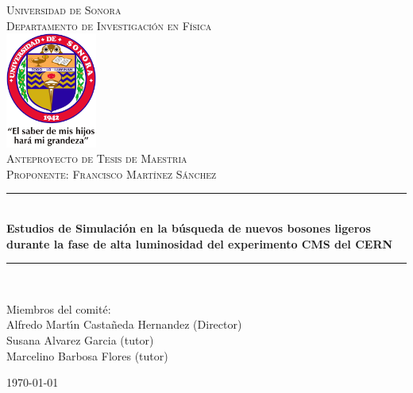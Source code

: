\newcommand{\HRule}{\rule{\linewidth}{0.5mm}} 

\begin{titlepage}
\center
\textsc{
\Huge{Universidad de Sonora}\\[.5cm]
\Large
Departamento de Investigaci\'on en F\'{\i}sica\\[1cm] 
\includegraphics[width=3cm]{unison}\\[3cm]
Anteproyecto de Tesis de Maestria \\[.7cm] 
Proponente: Francisco Mart\'{\i}nez S\'anchez}\\[.7cm] 

\sffamily
\HRule \\[0.4cm]
\textbf{\LARGE Estudios de Simulaci\'on en la b\'usqueda de nuevos bosones ligeros durante la fase de alta luminosidad del experimento CMS del CERN}\\[0.2cm] 
\HRule \\[3cm]
 
\large
\begin{minipage}[t]{.6\textwidth}
\begin{flushleft}
Miembros del comit\'e:
\\
Alfredo Mart\'{\i}n Casta\~neda Hernandez (Director)\\
Susana Alvarez Garcia (tutor)\\
Marcelino Barbosa Flores (tutor)\\
\end{flushleft}

\end{minipage}\hfill




{\today}\\[3cm]

\end{titlepage}


